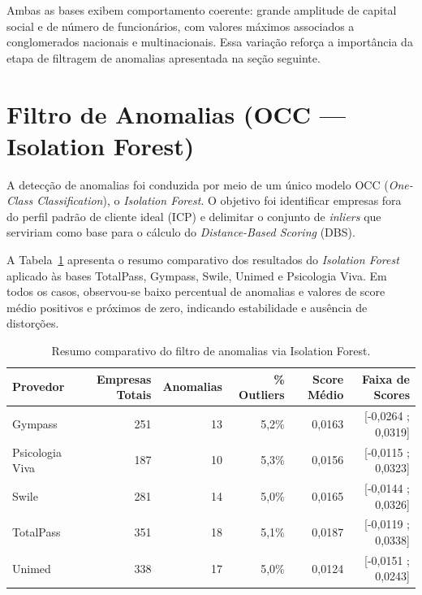 Ambas as bases exibem comportamento coerente: grande amplitude de capital social e de número de funcionários, com valores máximos associados a conglomerados nacionais e multinacionais. Essa variação reforça a importância da etapa de filtragem de anomalias apresentada na seção seguinte.


\section{Filtro de Anomalias (OCC — Isolation Forest)}

A detecção de anomalias foi conduzida por meio de um único modelo OCC (\textit{One-Class Classification}), o \textit{Isolation Forest}. O objetivo foi identificar empresas fora do perfil padrão de cliente ideal (ICP) e delimitar o conjunto de \textit{inliers} que serviriam como base para o cálculo do \textit{Distance-Based Scoring} (DBS).

A Tabela~\ref{tab:7_4_occ_all} apresenta o resumo comparativo dos resultados do \textit{Isolation Forest} aplicado às bases TotalPass, Gympass, Swile, Unimed e Psicologia Viva. Em todos os casos, observou-se baixo percentual de anomalias e valores de score médio positivos e próximos de zero, indicando estabilidade e ausência de distorções.

\begin{table}[H]
\centering
\caption{Resumo comparativo do filtro de anomalias via Isolation Forest.}
\label{tab:7_4_occ_all}
\begin{tabular}{lrrrrr}
\toprule
\textbf{Provedor} & \textbf{Empresas Totais} & \textbf{Anomalias} & \textbf{\% Outliers} & \textbf{Score Médio} & \textbf{Faixa de Scores} \\
\midrule
Gympass & 251 & 13 & 5,2\% & 0,0163 & [-0,0264 ; 0,0319] \\
Psicologia Viva & 187 & 10 & 5,3\% & 0,0156 & [-0,0115 ; 0,0323] \\
Swile & 281 & 14 & 5,0\% & 0,0165 & [-0,0144 ; 0,0326] \\
TotalPass & 351 & 18 & 5,1\% & 0,0187 & [-0,0119 ; 0,0338] \\
Unimed & 338 & 17 & 5,0\% & 0,0124 & [-0,0151 ; 0,0243] \\
\bottomrule
\end{tabular}
\end{table}


